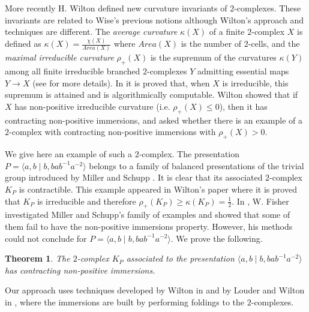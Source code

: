 \documentclass{amsart}
\theoremstyle{plain}
\newtheorem{thm}{Theorem}[section]
\theoremstyle{definition}
\theoremstyle{remark}
\numberwithin{equation}{section}
\begin{document}
More recently H. Wilton \cite{Wil22a} defined new curvature invariants of $2$-complexes. These invariants are related to Wise's previous notions although Wilton's approach and techniques are different. The \emph{average curvature} $\kappa(X)$ of a finite $2$-complex $X$ is defined as $\kappa(X)=\frac{\chi(X)}{Area(X)}$ where $Area(X)$ is the number of $2$-cells, and the \emph{maximal irreducible curvature} $\rho_+(X)$ is the supremum of the curvatures $\kappa(Y)$ among all finite irreducible branched $2$-complexes $Y$ admitting essential maps $Y\to X$ (see \cite{Wil22a} for more details). In  \cite{Wil22b} it is proved that, when $X$ is irreducible, this supremum is attained  and  is algorithmically computable. Wilton showed that if $X$ has non-positive irreducible curvature (i.e.  $\rho_+(X)\leq 0$), then it has contracting non-positive immersions, and asked whether there is an example of a $2$-complex with contracting non-positive immersions with $\rho_+(X)>0$.

We give here an example of such a $2$-complex. The presentation $P = \langle a,b \mid b, bab^{-1}a^{-2}\rangle$ belongs to a family of balanced presentations of the trivial group introduced by Miller and Schupp \cite{MS99}. It is clear that its associated $2$-complex $K_P$ is contractible. This example appeared in Wilton's paper \cite[Example 4.8]{Wil22a} where it is proved that $K_P$ is irreducible and therefore $\rho_+(K_P)\geq \kappa(K_P)=\frac12$. In \cite{Fis22}, W. Fisher investigated Miller and Schupp's family of examples and showed that some of them fail to have the non-positive immersions property. However, his methods could not conclude for  $P = \langle a,b \mid b, bab^{-1}a^{-2}\rangle$. We prove the following.

\begin{thm}\label{main}
	The $2$-complex $K_P$ associated to the presentation $\langle a,b \mid b, bab^{-1}a^{-2}\rangle$ has contracting non-positive immersions.
\end{thm}

Our approach uses techniques developed by Wilton in \cite{Wil22a} and by Louder and Wilton in \cite{LW20}, where the immersions are built by performing foldings to the $2$-complexes.



\end{document}
